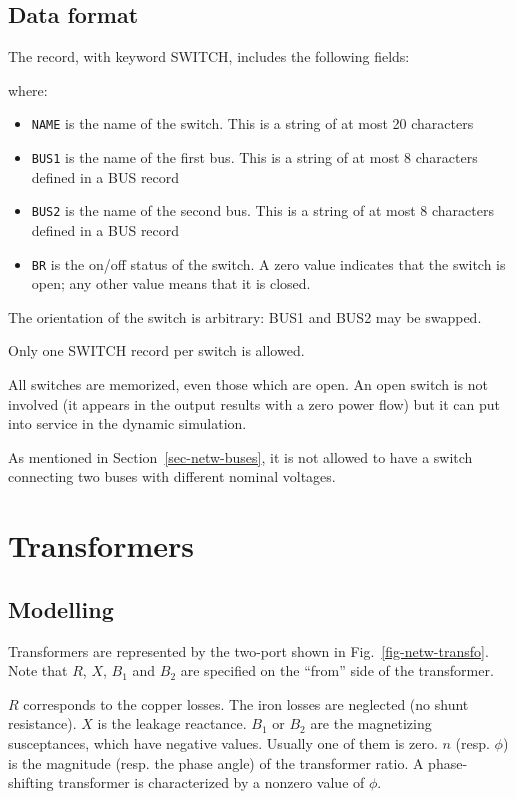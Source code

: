 \subsection{Data format}

The record, with keyword SWITCH, includes the following fields:

\hspace*{5ex}{\tt SWITCH NAME BUS1 BUS2 BR ;}

where:
\begin{itemize}
\item {\tt NAME} is the name of the switch.  This is a string of at most 20 characters
\item {\tt BUS1} is the name of the first bus. This is a string of at most 8 characters defined in a BUS record
\item {\tt BUS2} is the name of the second bus. This is a string of at most 8 characters defined in a BUS record
\item {\tt BR} is the on/off status of the switch. A zero value indicates that the switch
is open; any other value means that it is closed.
\end{itemize}

The orientation of the switch is arbitrary: BUS1 and BUS2 may be swapped.

Only one SWITCH record per switch is allowed.

All switches are memorized, even those which are open. An open switch is not involved (it appears in the output results with a zero power flow) but it can put into service in the dynamic simulation.

As mentioned in Section~\ref{sec-netw-buses}, it is not allowed to have a switch connecting two buses with different nominal voltages.

\section{Transformers}

\subsection{Modelling}

Transformers are represented by the two-port shown in Fig.~\ref{fig-netw-transfo}. Note that  $R$, $X$, $B_1$ and $B_2$ are specified on the ``from'' side of the transformer.

$R$ corresponds to the copper losses. The iron losses are neglected (no shunt resistance). $X$ is the leakage reactance. $B_1$ or $B_2$ are the magnetizing susceptances, which have negative values. Usually one of them is zero. $n$ (resp. $\phi$) is the magnitude (resp. the phase angle) of the transformer ratio. A phase-shifting transformer is characterized by a nonzero value of $\phi$.

